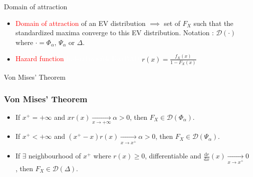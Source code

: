 \documentclass{beamer}
\begin{document}
\begin{frame}{Domain of attraction}
	\begin{itemize}
		\item \textcolor{red}{Domain of attraction} of an EV distribution $\implies$ set of $F_X$ such that the standardized maxima converge to this EV distribution. \newline
		Notation : $\mathcal{D}(\cdot)$ where $\cdot = \Phi_\alpha$, $\Psi_\alpha$ or $\Delta$.
		\newline
		\item \textcolor{red}{Hazard function} \newline
		 \textcolor{white}{IndentInvisibleTextBAD} $r(x) = \frac{f_X(x)}{1 - F_X(x)}$
	\end{itemize}
\end{frame}

\begin{frame}{Von Mises' Theorem}
	\frametitle{Von Mises' Theorem}
	\begin{theorem}
		\begin{itemize}
		\item If $x^+ = + \infty$ and $x r(x) \xrightarrow[x \rightarrow + \infty]{} \alpha > 0$, then $F_X \in \mathcal{D}(\Phi_\alpha)$.
		\item If $x^+ < + \infty$ and $(x^+ - x) r(x) \xrightarrow[x \rightarrow x^+]{} \alpha > 0$, then $F_X \in \mathcal{D}(\Psi_\alpha)$.
		\item If $\exists$ neighbourhood of $x^+$ where $r(x) \ge 0$, differentiable and $\frac{\mathrm{d}r}{\mathrm{d}x}(x) \xrightarrow[x \rightarrow x^+]{} 0$, then $F_X \in \mathcal{D}(\Delta)$.
		\end{itemize}
	\end{theorem}
\end{frame}
\end{document}
